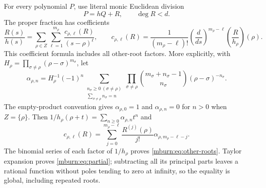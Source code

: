 For every polynomial $P$, use literal monic Euclidean division
\begin{equation}\label{mburn:eq:division}
 P=hQ+R,\qquad \deg R<d.
\end{equation}
The proper fraction has coefficients
\begin{equation}\label{mburn:eq:partial}
 \frac{R(s)}{h(s)}=
 \sum_{\rho\in Z}\sum_{\ell=1}^{m_\rho}
        \frac{c_{\rho,\ell}(R)}{(s-\rho)^\ell},\qquad
 c_{\rho,\ell}(R)=
 \frac{1}{(m_\rho-\ell)!}
 \left(\frac d{ds}\right)^{m_\rho-\ell}
                  \left(\frac R{h_\rho}\right)(\rho).
\end{equation}
This coefficient formula includes all other-root factors. More
explicitly, with $H_\rho=\prod_{\sigma\ne\rho}
(\rho-\sigma)^{m_\sigma}$, let
\begin{equation}\label{mburn:eq:other-roots}
 \alpha_{\rho,n}=H_\rho^{-1}(-1)^n
 \sum_{\substack{n_\sigma\geq0\ (\sigma\ne\rho)\\
                         \sum_{\sigma\ne\rho}n_\sigma=n}}
 \prod_{\sigma\ne\rho}
  \binom{m_\sigma+n_\sigma-1}{n_\sigma}
                    (\rho-\sigma)^{-n_\sigma}.
\end{equation}
The empty-product convention gives $\alpha_{\rho,0}=1$ and
$\alpha_{\rho,n}=0$ for $n>0$ when $Z=\{\rho\}$.
Then $1/h_\rho(\rho+t)=\sum_{n\geq0}\alpha_{\rho,n}t^n$ and
\[
 c_{\rho,\ell}(R)=\sum_{j=0}^{m_\rho-\ell}
       \frac{R^{(j)}(\rho)}{j!}\alpha_{\rho,m_\rho-\ell-j}.
\]
The binomial series of each factor of $1/h_\rho$ proves
\eqref{mburn:eq:other-roots}. Taylor expansion proves
\eqref{mburn:eq:partial}; subtracting all its principal parts leaves
a rational function without poles tending to zero at infinity,
so the equality is global, including repeated roots.


